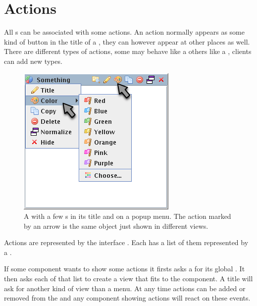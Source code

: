 \section{Actions} \label{sec:actions}
All s can be associated with some actions. An action normally appears as some kind of button in the title of a , they can however appear at other places as well. There are different types of actions, some may behave like a  others like a , clients can add new types.

\begin{figure}[h]
\centering
\includegraphics[scale=0.5]{actions/actions}
\caption{A  with a few s in its title and on a popup menu. The action marked by an arrow is the same object just shown in different views.}
\label{fig:actions}
\end{figure}


Actions are represented by the interface . Each  has a list of them represented by a .

If some component wants to show some actions it firsts asks a  for its global . It then asks each  of that list to create a view that fits to the component. A title will ask for another kind of view than a menu. At any time actions can be added or removed from the  and any component showing actions will react on these events.



